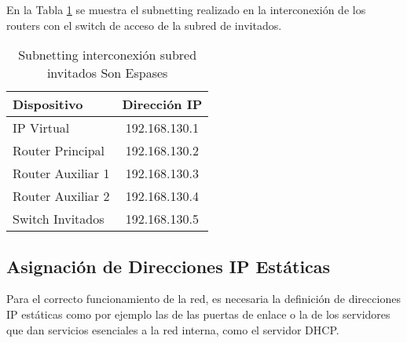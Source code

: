En la Tabla \ref{tab:subnettingIntInvitados} se muestra el subnetting realizado en la interconexión de los routers con el switch de acceso de la subred de invitados.
\begin{table}[H]
    \centering
    \scriptsize
    \begin{tabular}{|l|c|}
        \hline
        \textbf{Dispositivo} & \textbf{Dirección IP} \\
        \hline
        IP Virtual & 192.168.130.1 \\
        \hline
        Router Principal & 192.168.130.2 \\
        \hline
        Router Auxiliar 1 & 192.168.130.3 \\
        \hline
        Router Auxiliar 2 & 192.168.130.4 \\
        \hline
        Switch Invitados & 192.168.130.5 \\
        \hline
    \end{tabular}
    \caption{Subnetting interconexión subred invitados Son Espases}
    \label{tab:subnettingIntInvitados}
\end{table}

\subsection{Asignación de Direcciones IP Estáticas}\label{subsec:estaticas}
Para el correcto funcionamiento de la red, es necesaria la definición de direcciones IP estáticas como por ejemplo las de las puertas de enlace o 
la de los servidores que dan servicios esenciales a la red interna, como el servidor DHCP.

